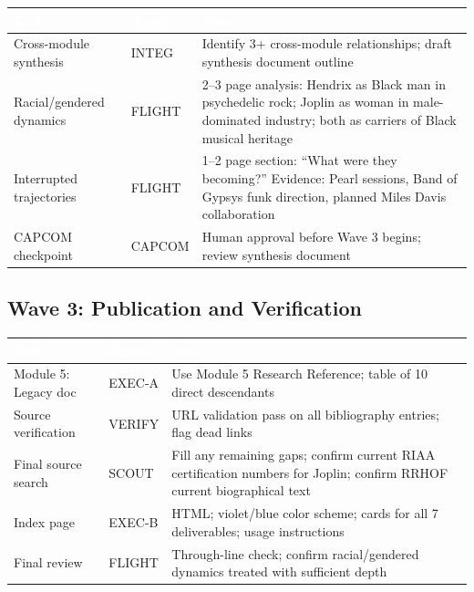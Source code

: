 \documentclass[11pt,letterpaper]{article}
\newcommand{\tableheader}[1]{\textbf{\sffamily\textcolor{white}{#1}}}
\begin{document}
\begin{center}
\begin{tabularx}{\textwidth}{L{3cm}L{2cm}X}
\toprule
{}
\tableheader{Task} & \tableheader{Agent} & \tableheader{Spec} \\
\midrule
Cross-module synthesis & INTEG & Identify 3+ cross-module relationships; draft synthesis document outline \\
Racial/gendered dynamics & FLIGHT & 2--3 page analysis: Hendrix as Black man in psychedelic rock; Joplin as woman in male-dominated industry; both as carriers of Black musical heritage \\
Interrupted trajectories & FLIGHT & 1--2 page section: ``What were they becoming?'' Evidence: Pearl sessions, Band of Gypsys funk direction, planned Miles Davis collaboration \\
CAPCOM checkpoint & CAPCOM & Human approval before Wave 3 begins; review synthesis document \\
\bottomrule
\end{tabularx}
\end{center}

\subsection{Wave 3: Publication and Verification}

\begin{center}
\begin{tabularx}{\textwidth}{L{3cm}L{2cm}X}
\toprule
{}
\tableheader{Task} & \tableheader{Agent} & \tableheader{Spec} \\
\midrule
Module 5: Legacy doc & EXEC-A & Use Module 5 Research Reference; table of 10 direct descendants \\
Source verification & VERIFY & URL validation pass on all bibliography entries; flag dead links \\
Final source search & SCOUT & Fill any remaining gaps; confirm current RIAA certification numbers for Joplin; confirm RRHOF current biographical text \\
Index page & EXEC-B & HTML; violet/blue color scheme; cards for all 7 deliverables; usage instructions \\
Final review & FLIGHT & Through-line check; confirm racial/gendered dynamics treated with sufficient depth \\
\bottomrule
\end{tabularx}
\end{center}
\end{document}
